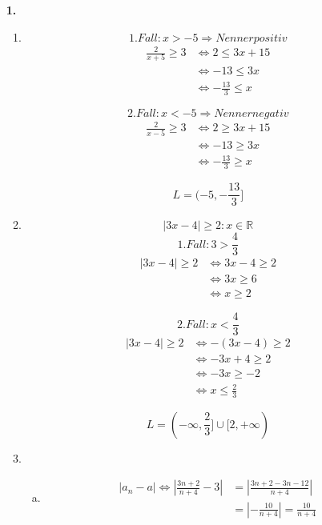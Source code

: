 \documentclass[a4paper]{scrartcl}
\title{\titleinfo}
\author{Elena Noll, Sven-Hendrik Haase, Arne Struck}
\date{\today}
\begin{document}
\maketitle

\begin{enumerate}
\item[\textbf{1.}]
\begin{enumerate}[1)]
\item

\[1. Fall: x > -5 \Rightarrow Nenner positiv\]
\begin{align}
\frac 2 {x+5} \geq 3 & \Leftrightarrow 2 \leq 3x+15\\
                   & \Leftrightarrow -13 \leq 3x\\
                   & \Leftrightarrow -\frac {13} 3 \leq x
\end{align} 

\[2. Fall: x < -5 \Rightarrow Nenner negativ\]
\begin{align}
\frac 2 {x-5} \geq 3 & \Leftrightarrow 2 \geq 3x+15\\
                   & \Leftrightarrow -13 \geq 3x\\
                   & \Leftrightarrow -\frac {13} 3 \geq x
\end{align}

\[L = (-5, -\frac {13} 3]\]

\newpage
\item
\[|3x-4| \geq 2 : x \in \mathbb{R} \] 
\[1. Fall: 3 > \frac 4 3\]
\begin{align}
|3x-4| \geq 2 & \Leftrightarrow 3x-4 \geq 2\\
              & \Leftrightarrow 3x \geq 6\\
              & \Leftrightarrow x \geq 2
\end{align}

\[2. Fall: x < \frac 4 3 \]
\begin{align}
|3x-4| \geq 2 & \Leftrightarrow -(3x-4) \geq 2\\
              & \Leftrightarrow -3x+4 \geq 2\\
              & \Leftrightarrow -3x \geq -2\\
              & \Leftrightarrow x \leq \frac 2 3
\end{align}

\[L = (-\infty, \frac 2 3] \cup [2, +\infty) \]


\item
\begin{enumerate}[a)]
\item
\begin{align}
|a_n - a| \Leftrightarrow | \frac {3n+2} {n+4} -3 | & = | \frac {3n+2-3n-12} {n+4} | \\
&= | -\frac {10} {n+4} | = \frac {10} {n+4}
\end{align}


\end{enumerate}
\end{enumerate}
\end{enumerate}
\end{document}
